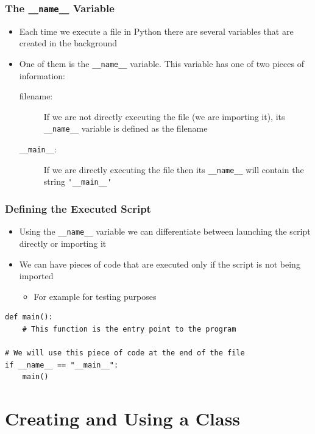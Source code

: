 \documentclass[11pt]{beamer}
\begin{document}
\begin{frame}\frametitle{The \texttt{\_\_name\_\_} Variable}
\begin{itemize}
\item Each time we execute a file in Python there are several variables that are created in the background
\item One of them is the \lstinline|__name__| variable. This variable has one of two pieces of information:
    \begin{description}
    \item[filename:] If we are not directly executing the file (we are importing it), its \lstinline|__name__| variable is defined as the filename
    \item[\texttt{\_\_main\_\_}:] If we are directly executing the file then its \lstinline|__name__| will contain the string \lstinline|'__main__'|
    \end{description} 
\end{itemize}
\end{frame}

\begin{frame}[fragile]\frametitle{Defining the Executed Script}
\begin{itemize}
\item Using the \lstinline|__name__| variable we can differentiate between launching the script directly or importing it
\item We can have pieces of code that are executed only if the script is not being imported
    \begin{itemize}
    \item For example for testing purposes
    \end{itemize}
\end{itemize}
\begin{lstlisting}
def main():
    # This function is the entry point to the program

# We will use this piece of code at the end of the file
if __name__ == "__main__":
    main()
\end{lstlisting}
\end{frame}


\section{Creating and Using a Class}
\end{document}
